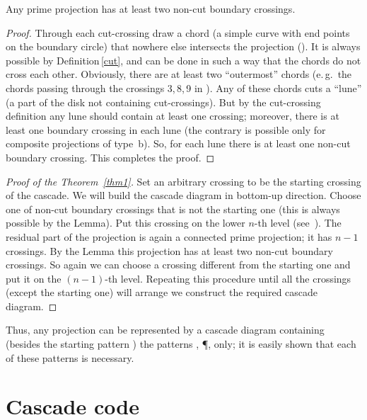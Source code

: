 \documentclass[12pt]{article}
\begin{document}
\begin{lmm} Any prime projection has at least two non-cut boundary crossings.\end{lmm}


\begin{proof}
Through each cut-crossing draw a chord (a simple curve with end points on the boundary circle)
that nowhere else intersects the projection (). It is always possible by
Definition\,\ref{cut}, and can be done in such a way that the chords do not cross each other.
Obviously, there are at least two ``outermost'' chords (e.\,g.~the chords passing through the
crossings 3,\,8,\,9 in ). Any of these chords cuts a ``lune'' (a part of the
disk not containing cut-crossings). But by the cut-crossing definition any lune should contain at
least one crossing; moreover, there is at least one boundary crossing in each lune (the contrary
is possible only for composite projections of type~b). So, for each lune
there is at least one non-cut boundary crossing. This completes the proof.\end{proof}

\begin{proof}[Proof of the Theorem~\ref{thm1}]
Set an arbitrary crossing to be the starting crossing of the cascade. We will build the cascade
diagram in bottom-up direction. Choose one of non-cut boundary crossings that is not the starting
one (this is always possible by the Lemma). Put this crossing on the lower $n$-th level
(see~). The residual part of the projection is again a connected prime
projection; it has $n{-}1$ crossings. By the Lemma this projection has at least two non-cut
boundary crossings. So again we can choose a crossing different from the starting one and put it
on the $(n{-}1)$-th level. Repeating this procedure until all the crossings (except the starting
one) will arrange we construct the required cascade diagram.\end{proof}

Thus, any projection can be represented by a cascade diagram containing (besides the starting
pattern \OI) the patterns \PI, \P, \X only; it is easily shown that each of these patterns is
necessary.


\section{Cascade code}
\end{document}
